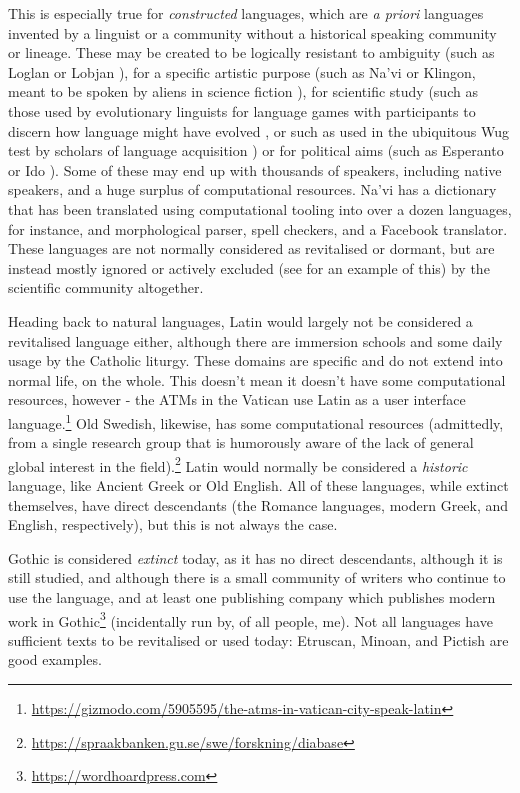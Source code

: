 This is especially true for \textit{constructed} languages, which are \textit{a priori} languages invented by a linguist or a community without a historical speaking community or lineage. These may be created to be logically resistant to ambiguity (such as Loglan or Lobjan \citep{okrent2009land}), for a specific artistic purpose (such as Na'vi or Klingon, meant to be spoken by aliens in science fiction \citep{schreyer2015digital, schreyer2011media}), for scientific study (such as those used by evolutionary linguists for language games with participants to discern how language might have evolved \citep{scott2010language}, or such as used in the ubiquitous Wug test by scholars of language acquisition \citep{ratner2000beginning}) or for political aims (such as Esperanto or Ido \citep{okrent2009land}). Some of these may end up with thousands of speakers, including native speakers, and a huge surplus of computational resources. Na'vi has a dictionary that has been translated using computational tooling into over a dozen languages, for instance, and morphological parser, spell checkers, and a Facebook translator. These languages are not normally considered as revitalised or dormant, but are instead mostly ignored or actively excluded (see \citet{gibson2016assessing} for an example of this) by the scientific community altogether.

Heading back to natural languages, Latin would largely not be considered a revitalised language either, although there are immersion schools and some daily usage by the Catholic liturgy. These domains are specific and do not extend into normal life, on the whole. This doesn't mean it doesn't have some computational resources, however - the ATMs in the Vatican use Latin as a user interface language.\footnote{\href{https://gizmodo.com/5905595/the-atms-in-vatican-city-speak-latin}{https://gizmodo.com/5905595/the-atms-in-vatican-city-speak-latin}} Old Swedish, likewise, has some computational resources (admittedly, from a single research group that is humorously aware of the lack of general global interest in the field).\footnote{\href{https://spraakbanken.gu.se/swe/forskning/diabase}{https://spraakbanken.gu.se/swe/forskning/diabase}} Latin would normally be considered a \textit{historic} language, like Ancient Greek or Old English. All of these languages, while extinct themselves, have direct descendants (the Romance languages, modern Greek, and English, respectively), but this is not always the case.

Gothic is considered \textit{extinct} today, as it has no direct descendants, although it is still studied, and although there is a small community of writers who continue to use the language, and at least one publishing company which publishes modern work in Gothic\footnote{\href{https://wordhoardpress.com}{https://wordhoardpress.com}} (incidentally run by, of all people, me). Not all languages have sufficient texts to be revitalised or used today: Etruscan, Minoan, and Pictish are good examples.

